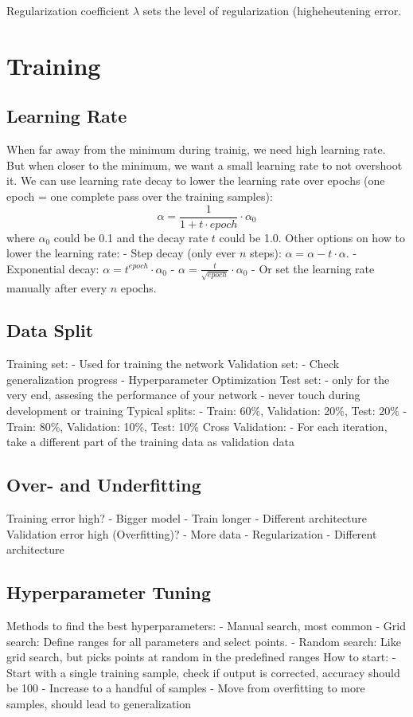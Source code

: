 \documentclass{scrartcl}
\begin{document}
Regularization coefficient $\lambda$ sets the level of regularization (higheheutening error.


\section*{Training}
\subsection*{Learning Rate}
When far away from the minimum during trainig, we need high learning rate. But when closer to the minimum, we want a small learning rate to not overshoot it.
We can use learning rate decay to lower the learning rate over epochs (one epoch = one complete pass over the training samples):
$$\alpha = \frac{1}{1 + t \cdot epoch} \cdot \alpha_0$$
where $\alpha_0$ could be 0.1 and the decay rate $t$ could be 1.0.
Other options on how to lower the learning rate:
- Step decay (only ever $n$ steps): $\alpha = \alpha - t \cdot \alpha$.
- Exponential decay: $\alpha = t^{epoch} \cdot \alpha_0$
- $\alpha = \frac{t}{\sqrt{epoch}} \cdot \alpha_0$
- Or set the learning rate manually after every $n$ epochs.

\subsection*{Data Split}
Training set:
- Used for training the network
Validation set:
- Check generalization progress
- Hyperparameter Optimization
Test set:
- only for the very end, assesing the performance of your network
- never touch during development or training
Typical splits:
- Train: 60\%, Validation: 20\%, Test: 20\%
- Train: 80\%, Validation: 10\%, Test: 10\%
Cross Validation:
- For each iteration, take a different part of the training data as validation data

\subsection*{Over- and Underfitting}
Training error high?
- Bigger model
- Train longer
- Different architecture
Validation error high (Overfitting)?
- More data
- Regularization
- Different architecture

\subsection*{Hyperparameter Tuning}
Methods to find the best hyperparameters:
- Manual search, most common
- Grid search: Define ranges for all parameters and select points.
- Random search: Like grid search, but picks points at random in the predefined ranges
How to start:
- Start with a single training sample, check if output is corrected, accuracy should be 100%
- Increase to a handful of samples
- Move from overfitting to more samples, should lead to generalization
\end{document}
